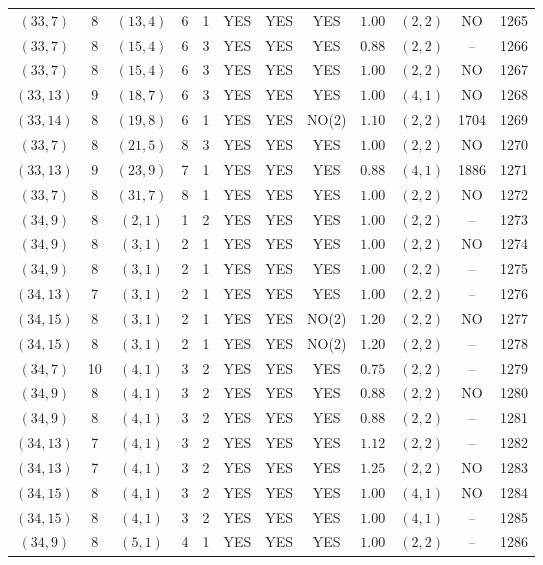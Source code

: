 \begin{longtable}{|c|c|c|c|c|c|c|c|c|c|c|c|}
$(33,7)$ & 8 & $(13,4)$ & 6 & 1 & YES & YES & YES & $1.00$ & $(2,2)$ & NO & 1265\\
$(33,7)$ & 8 & $(15,4)$ & 6 & 3 & YES & YES & YES & $0.88$ & $(2,2)$ & -- & 1266\\
$(33,7)$ & 8 & $(15,4)$ & 6 & 3 & YES & YES & YES & $1.00$ & $(2,2)$ & NO & 1267\\
$(33,13)$ & 9 & $(18,7)$ & 6 & 3 & YES & YES & YES & $1.00$ & $(4,1)$ & NO & 1268\\
$(33,14)$ & 8 & $(19,8)$ & 6 & 1 & YES & YES & NO(2) & $1.10$ & $(2,2)$ & 1704 & 1269\\
$(33,7)$ & 8 & $(21,5)$ & 8 & 3 & YES & YES & YES & $1.00$ & $(2,2)$ & NO & 1270\\
$(33,13)$ & 9 & $(23,9)$ & 7 & 1 & YES & YES & YES & $0.88$ & $(4,1)$ & 1886 & 1271\\
$(33,7)$ & 8 & $(31,7)$ & 8 & 1 & YES & YES & YES & $1.00$ & $(2,2)$ & NO & 1272\\
$(34,9)$ & 8 & $(2,1)$ & 1 & 2 & YES & YES & YES & $1.00$ & $(2,2)$ & -- & 1273\\
$(34,9)$ & 8 & $(3,1)$ & 2 & 1 & YES & YES & YES & $1.00$ & $(2,2)$ & NO & 1274\\
$(34,9)$ & 8 & $(3,1)$ & 2 & 1 & YES & YES & YES & $1.00$ & $(2,2)$ & -- & 1275\\
$(34,13)$ & 7 & $(3,1)$ & 2 & 1 & YES & YES & YES & $1.00$ & $(2,2)$ & -- & 1276\\
$(34,15)$ & 8 & $(3,1)$ & 2 & 1 & YES & YES & NO(2) & $1.20$ & $(2,2)$ & NO & 1277\\
$(34,15)$ & 8 & $(3,1)$ & 2 & 1 & YES & YES & NO(2) & $1.20$ & $(2,2)$ & -- & 1278\\
$(34,7)$ & 10 & $(4,1)$ & 3 & 2 & YES & YES & YES & $0.75$ & $(2,2)$ & -- & 1279\\
$(34,9)$ & 8 & $(4,1)$ & 3 & 2 & YES & YES & YES & $0.88$ & $(2,2)$ & NO & 1280\\
$(34,9)$ & 8 & $(4,1)$ & 3 & 2 & YES & YES & YES & $0.88$ & $(2,2)$ & -- & 1281\\
$(34,13)$ & 7 & $(4,1)$ & 3 & 2 & YES & YES & YES & $1.12$ & $(2,2)$ & -- & 1282\\
$(34,13)$ & 7 & $(4,1)$ & 3 & 2 & YES & YES & YES & $1.25$ & $(2,2)$ & NO & 1283\\
$(34,15)$ & 8 & $(4,1)$ & 3 & 2 & YES & YES & YES & $1.00$ & $(4,1)$ & NO & 1284\\
$(34,15)$ & 8 & $(4,1)$ & 3 & 2 & YES & YES & YES & $1.00$ & $(4,1)$ & -- & 1285\\
$(34,9)$ & 8 & $(5,1)$ & 4 & 1 & YES & YES & YES & $1.00$ & $(2,2)$ & -- & 1286\\

\end{longtable}
